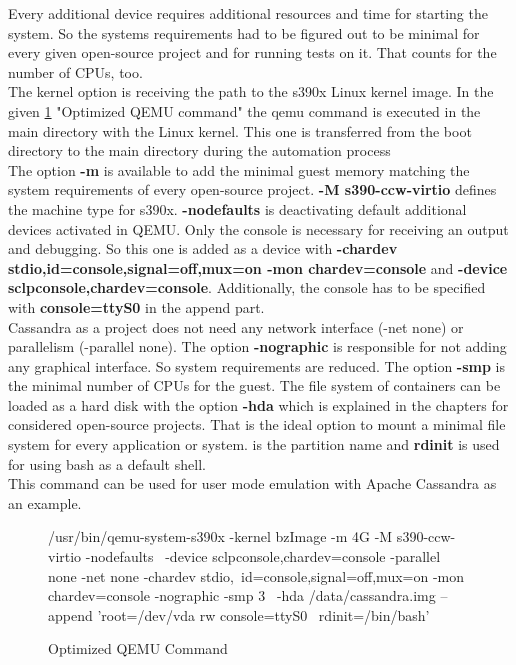 Every additional device requires additional resources and time for starting the system. 
So the systems requirements had to be figured out to be minimal for every given open-source project and for running tests on it. 
That counts for the number of CPUs, too. \\

The kernel option is receiving the path to the s390x Linux kernel image. In the given \ref{QEMU-Command} "Optimized QEMU command" the qemu command is executed in the main directory with the Linux kernel. This one is transferred from the boot directory to the main directory during the automation process \\  
The option \textbf{-m} is available to add the minimal guest memory matching the system requirements of every open-source project. \textbf{-M s390-ccw-virtio} defines the machine type for s390x.
\textbf{-nodefaults} is deactivating default additional devices activated in QEMU. 
Only the console is necessary for receiving an output and debugging. 
So this one is added as a device with \textbf{-chardev stdio,id=console,signal=off,mux=on -mon chardev=console} and \textbf{-device sclpconsole,chardev=console}. Additionally, the console has to be specified with \textbf{console=ttyS0} in the append part. \\ 
Cassandra as a project does not need any network interface (-net none) or parallelism (-parallel none). The option \textbf{-nographic} is responsible for not adding any graphical interface. 
So system requirements are reduced. The option \textbf{-smp} is the minimal number of CPUs for the guest. 
The file system of containers can be loaded as a hard disk with the option \textbf{-hda} which is explained in the chapters for considered open-source projects. 
That is the ideal option to mount a minimal file system for every application or system. 
 is the partition name and \textbf{rdinit} is used for using bash as a default shell. \\
This command can be used for user mode emulation with Apache Cassandra as an example.


\begin{figure}[H]
\centering
\begin{boxedverbatim}
/usr/bin/qemu-system-s390x -kernel bzImage -m 4G -M s390-ccw-virtio -nodefaults \
-device sclpconsole,chardev=console -parallel none -net none -chardev stdio,\
id=console,signal=off,mux=on -mon chardev=console -nographic -smp 3 \
-hda /data/cassandra.img  --append 'root=/dev/vda rw console=ttyS0 \
rdinit=/bin/bash'
\end{boxedverbatim}
 \caption{Optimized QEMU Command}
    \label{QEMU-Command}
\end{figure}

